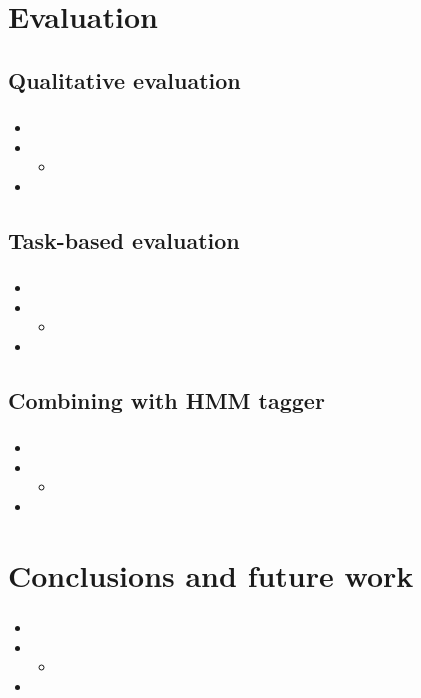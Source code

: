 \documentclass{beamer}
\begin{document}
\section{Evaluation}
\subsection{Qualitative evaluation} %
\begin{frame}
\frametitle{}
\framesubtitle{}
\begin{itemize}
	\item 
	\pause
	\item 
	\begin{itemize}
		\item 
		\pause
	\end{itemize}
	\item 
\end{itemize}
\end{frame}

\subsection{Task-based evaluation} %

\begin{frame}
\frametitle{}
\framesubtitle{}
\begin{itemize}
	\item 
	\pause
	\item 
	\begin{itemize}
		\item 
		\pause
	\end{itemize}
	\item 
\end{itemize}
\end{frame}


\subsection{Combining with HMM tagger} %

\begin{frame}
\frametitle{}
\framesubtitle{}
\begin{itemize}
	\item 
	\pause
	\item 
	\begin{itemize}
		\item 
		\pause
	\end{itemize}
	\item 
\end{itemize}
\end{frame}

\section{Conclusions and future work} %
\begin{frame}
\frametitle{}
\framesubtitle{}
\begin{itemize}
	\item 
	\pause
	\item 
	\begin{itemize}
		\item 
		\pause
	\end{itemize}
	\item 
\end{itemize}
\end{frame}


\begin{tiny}

\end{tiny}
\end{document}
